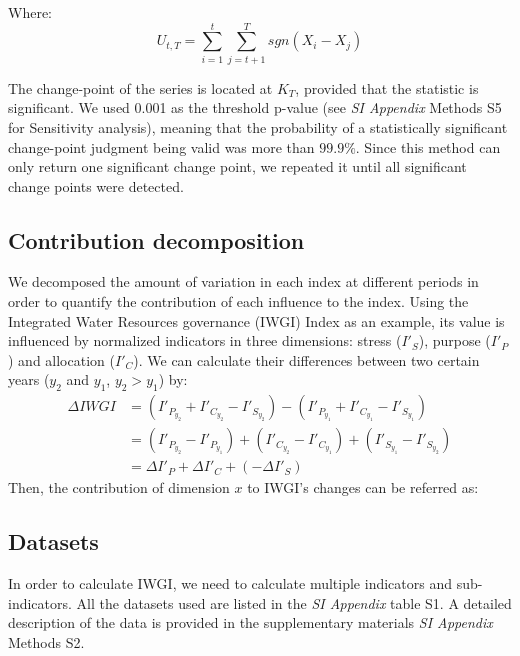 		Where:
		\begin{equation}
			U_{t, T} = \sum_{i=1}^t\sum_{j=t+1}^T sgn(X_i - X_j)
		\end{equation}

		The change-point of the series is located at $K_T$, provided that the statistic is significant. We used 0.001 as the threshold p-value (see \textit{SI Appendix} Methods S5 for Sensitivity analysis), meaning that the probability of a statistically significant change-point judgment being valid was more than $99.9\%$.
		Since this method can only return one significant change point, we repeated it until all significant change points were detected.

	\subsection{Contribution decomposition}
		We decomposed the amount of variation in each index at different periods in order to quantify the contribution of each influence to the index. Using the Integrated Water Resources governance (IWGI) Index as an example, its value is influenced by normalized indicators in three dimensions: stress ($I'_S$), purpose ($I'_P$) and allocation ($I'_C$). We can calculate their differences between two certain years ($y_2$ and $y_1$, $y_2 > y_1$) by:
		\begin{align}
		\Delta IWGI &= (I'_{P_{y_2}} + I'_{C_{y_2}} - I'_{S_{y_2}}) - (I'_{P_{y_1}} + I'_{C_{y_1}} - I'_{S_{y_1}}) \\
		&= (I'_{P_{y_2}} - I'_{P_{y_1}}) + (I'_{C_{y_2}} - I'_{C_{y_1}}) + (I'_{S_{y_1}} - I'_{S_{y_2}}) \\
		&= \Delta I'_P + \Delta I'_C + (-\Delta I'_S)
		\end{align}
		Then, the contribution of dimension $x$ to IWGI's changes can be referred as:



	\subsection{Datasets}
	In order to calculate IWGI, we need to calculate multiple indicators and sub-indicators. All the datasets used are listed in the \textit{SI Appendix} table S1. A detailed description of the data is provided in the supplementary materials \textit{SI Appendix} Methods S2.
